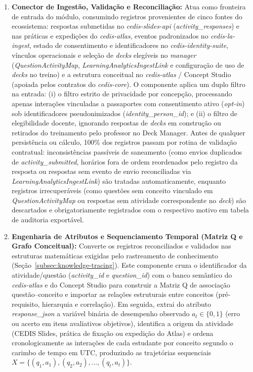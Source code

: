 \begin{enumerate}
    \item \textbf{Conector de Ingestão, Validação e Reconciliação:} Atua como fronteira de entrada do módulo, consumindo registros provenientes de cinco fontes do ecossistema: respostas submetidas no \textit{cedis-slides-api} (\textit{activity\_\allowbreak responses}) e nas práticas e expedições do \textit{cedis-atlas}, eventos padronizados no \textit{cedis-la-ingest}, estado de consentimento e identificadores no \textit{cedis-identity-suite}, vínculos operacionais e seleção de \textit{decks} elegíveis no \textit{manager} (\textit{QuestionActivityMap}, \textit{LearningAnalyticsIngestLink} e configuração de uso de \textit{decks} no treino) e a estrutura conceitual no \textit{cedis-atlas} / Concept Studio (apoiada pelos contratos do \textit{cedis-core}). O componente aplica um duplo filtro na entrada: (i) o filtro estrito de privacidade por concepção, processando apenas interações vinculadas a passaportes com consentimento ativo (\textit{opt-in}) sob identificadores pseudonimizados (\textit{identity\_person\_id}); e (ii) o filtro de elegibilidade docente, ignorando respostas de \textit{decks} em construção ou retirados do treinamento pelo professor no Deck Manager. Antes de qualquer persistência ou cálculo, 100\% dos registros passam por rotina de validação contratual: inconsistências passíveis de saneamento (como envios duplicados de \textit{activity\_submitted}, horários fora de ordem reordenados pelo registro da resposta ou respostas sem evento de envio reconciliadas via \textit{LearningAnalyticsIngestLink}) são tratadas automaticamente, enquanto registros irrecuperáveis (como questões sem conceito vinculado em \textit{QuestionActivityMap} ou respostas sem atividade correspondente no \textit{deck}) são descartados e obrigatoriamente registrados com o respectivo motivo em tabela de auditoria exportável.

    \item \textbf{Engenharia de Atributos e Sequenciamento Temporal (Matriz Q e Grafo Conceitual):} Converte os registros reconciliados e validados nas estruturas matemáticas exigidas pelo rastreamento de conhecimento (Seção~\ref{subsec:knowledge-tracing}). Este componente cruza o identificador da atividade/questão (\textit{activity\_id} e \textit{question\_id}) com o banco semântico do \textit{cedis-atlas} e do Concept Studio para construir a Matriz Q de associação questão--conceito e importar as relações estruturais entre conceitos (pré-requisito, hierarquia e correlação). Em seguida, extrai do atributo \textit{response\_json} a variável binária de desempenho observado $a_t \in \{0, 1\}$ (erro ou acerto em itens avaliativos objetivos), identifica a origem da atividade (CEDIS Slides, prática de fixação ou expedição do Atlas) e ordena cronologicamente as interações de cada estudante por conceito segundo o carimbo de tempo em UTC, produzindo as trajetórias sequenciais $X = \{(q_1, a_1), (q_2, a_2), \ldots, (q_t, a_t)\}$.


\end{enumerate}

